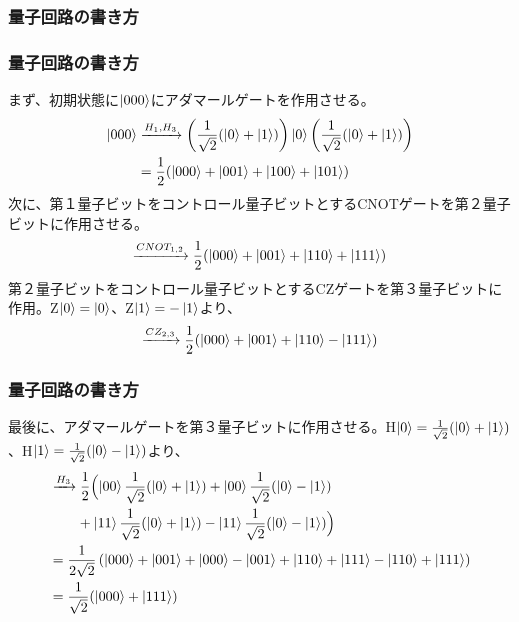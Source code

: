 \documentclass[9pt]{beamer}
\begin{document}
\begin{frame}
  \frametitle{量子回路の書き方}
\end{frame}

\begin{frame}
	\frametitle{量子回路の書き方}
    まず、初期状態に$\ket{000}$にアダマールゲートを作用させる。
  \begin{align}
    \ket{000} &\xrightarrow{H_1, H_3} \left(\frac{1}{\sqrt{2}}(\ket{0} + \ket{1}) \right) \ket{0} \left(\frac{1}{\sqrt{2}}(\ket{0} + \ket{1}) \right) \\
    &= \frac{1}{2}(\ket{000} + \ket{001} + \ket{100} + \ket{101})
  \end{align}
  次に、第１量子ビットをコントロール量子ビットとするCNOTゲートを第２量子ビットに作用させる。
  \begin{align}
    \xrightarrow{CNOT_{1,2}} \frac{1}{2}(\ket{000} + \ket{001} + \ket{110} + \ket{111})
  \end{align}
  第２量子ビットをコントロール量子ビットとするCZゲートを第３量子ビットに作用。Z$\ket{0} = \ket{0}$、Z$\ket{1} = -\ket{1}$より、
  \begin{align}
    \xrightarrow{CZ_{2,3}} \frac{1}{2}(\ket{000} + \ket{001} + \ket{110} - \ket{111})
  \end{align}
\end{frame}

\begin{frame}
  \frametitle{量子回路の書き方}
  最後に、アダマールゲートを第３量子ビットに作用させる。H$\ket{0} = \frac{1}{\sqrt{2}}(\ket{0} + \ket{1})$、H$\ket{1} = \frac{1}{\sqrt{2}}(\ket{0} - \ket{1})$より、
  \begin{align}
    &\xrightarrow{H_3} \frac{1}{2} \Bigl( \ket{00}\frac{1}{\sqrt{2}}(\ket{0} + \ket{1}) + \ket{00}\frac{1}{\sqrt{2}}(\ket{0} - \ket{1}) \\
    &\qquad + \ket{11}\frac{1}{\sqrt{2}}(\ket{0} + \ket{1}) - \ket{11}\frac{1}{\sqrt{2}}(\ket{0} - \ket{1}) \Bigr) \\
    &= \frac{1}{2\sqrt{2}} \left( \ket{000} +\ket{001} + \ket{000} - \ket{001} + \ket{110} + \ket{111} - \ket{110} + \ket{111} \right) \\
    &= \frac{1}{\sqrt{2}}(\ket{000} + \ket{111})
  \end{align}
\end{frame}
\end{document}
